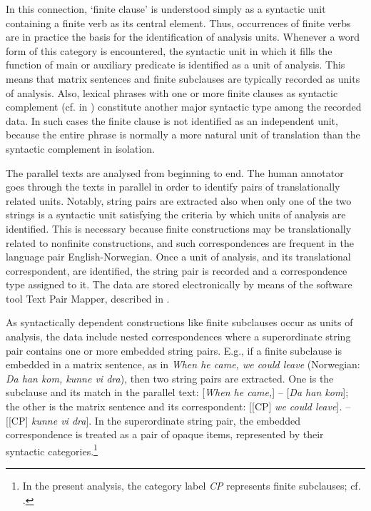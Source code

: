 \documentclass[output=paper]{LSP/langsci}
\begin{document}
In this connection, `finite clause' is understood simply as a syntactic unit containing a finite verb as its central element. Thus, occurrences of finite verbs are in practice the basis for the identification of analysis units. Whenever a word form of this category is encountered, the syntactic unit in which it fills the function of main or auxiliary predicate is identified as a unit of analysis. This means that matrix sentences and finite subclauses are typically recorded as units of analysis. Also, lexical phrases with one or more finite clauses as syntactic complement (cf.  in ) constitute another major syntactic type among the recorded data. In such cases the finite clause is not identified as an independent unit, because the entire phrase is normally a more natural unit of translation than the syntactic complement in isolation. 

The parallel texts are analysed from beginning to end. The human annotator goes through the texts in parallel in order to identify pairs of translationally related units. Notably, string pairs are extracted also when only one of the two strings is a syntactic unit satisfying the criteria by which units of analysis are identified. This is necessary because finite constructions may be translationally related to nonfinite constructions, and such correspondences are frequent in the language pair English-Norwegian. Once a unit of analysis, and its translational correspondent, are identified, the string pair is recorded and a correspondence type assigned to it. The data are stored electronically by means of the software tool Text Pair Mapper, described in \citet{Dyvik1993}. 

As syntactically dependent constructions like finite subclauses occur as units of analysis, the data include nested correspondences where a superordinate string pair contains one or more embedded string pairs. E.g., if a finite subclause is embedded in a matrix sentence, as in \textit{When he came, we could leave} (Norwegian: \textit{Da han kom, kunne vi dra}), then two string pairs are extracted. One is the subclause and its match in the parallel text: [\textit{When he came,}] -- [\textit{Da han kom}]; the other is the matrix sentence and its correspondent: [[CP] \textit{we could leave}]\textit{.} -- [[CP] \textit{kunne vi dra}]. In the superordinate string pair, the embedded correspondence is treated as a pair of opaque items, represented by their syntactic categories.\footnote{In the present analysis, the category label \textit{CP} represents finite subclauses; cf. \citet[201]{Thunes2011}.} 
\end{document}
